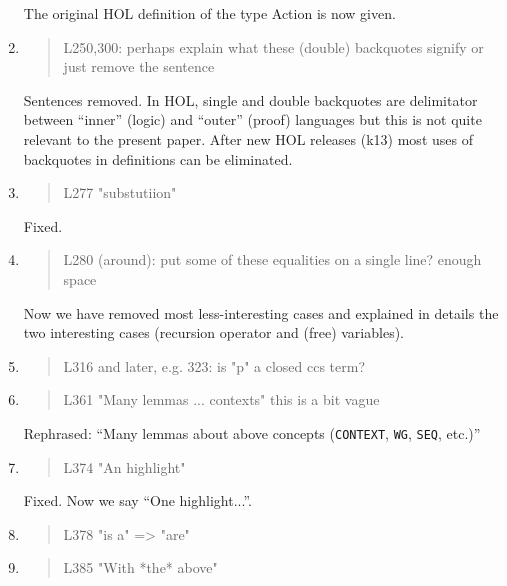 \begin{enumerate}
  The original HOL definition of the type Action is now given.
  
\item \begin{quote}
    L250,300: perhaps explain what these (double) backquotes signify or just remove the sentence
  \end{quote}
  Sentences removed. In HOL, single and double backquotes are
  delimitator between ``inner'' (logic) and ``outer'' (proof)
  languages but this is not quite relevant to the present paper.
  After new HOL releases (k13) most uses of backquotes in  definitions can be eliminated.
  
\item \begin{quote}
    L277 "substutiion"
  \end{quote}
  Fixed.
  
\item \begin{quote}
    L280 (around): put some of these equalities on a single line? enough space
  \end{quote}
  Now we have removed most less-interesting cases and explained in
  details the two interesting cases (recursion operator and (free) variables).
  
\item \begin{quote}
    L316 and later, e.g. 323: is "p" a closed ccs term?
  \end{quote}

\item \begin{quote}
    L361 "Many lemmas ... contexts" this is a bit vague
  \end{quote}

  Rephrased: ``Many lemmas about above concepts (\texttt{CONTEXT}, \texttt{WG},
  \texttt{SEQ}, etc.)''
  
\item \begin{quote}
    L374 "An highlight"
  \end{quote}
  Fixed. Now we say ``One highlight...''.
  
\item \begin{quote}
    L378 "is a" => "are"
  \end{quote}

\item \begin{quote}
    L385 "With *the* above"
  \end{quote}


\end{enumerate}
